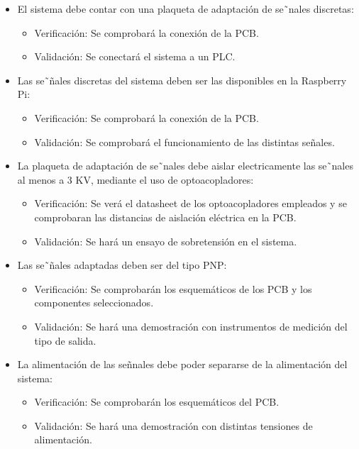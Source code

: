 \documentclass[
11pt, %
codirector, %
]{charter}
\begin{document}
\begin{itemize}
	\item \REQ El sistema debe contar con una plaqueta de adaptación de se˜nales discretas:
	\begin{itemize}
		\item Verificación: Se comprobará la conexión de la PCB.
		\item Validación: Se conectará el sistema a un PLC.
	\end{itemize}
	
	\item \REQ Las se˜ñales discretas del sistema deben ser las disponibles en la Raspberry Pi:
	\begin{itemize}
		\item Verificación: Se comprobará la conexión de la PCB.
		\item Validación: Se comprobará el funcionamiento de las distintas señales.
	\end{itemize}
	
	\item \REQ La plaqueta de adaptación de se˜nales debe aislar electricamente las se˜nales al menos a 3 KV, mediante el uso de optoacopladores:
	\begin{itemize}
		\item Verificación: Se verá el datasheet de los optoacopladores empleados y se comprobaran las distancias de aislación eléctrica en la PCB.
		\item Validación: Se hará un ensayo de sobretensión en el sistema.
	\end{itemize}
	
	\item \REQ Las se˜ñales adaptadas deben ser del tipo PNP:
	\begin{itemize}
		\item Verificación: Se comprobarán los esquemáticos de los PCB y los componentes seleccionados.
		\item Validación: Se hará una demostración con instrumentos de medición del tipo de salida.
	\end{itemize}	
	
	\item \REQ La alimentación de las señnales debe poder separarse de la alimentación del sistema:
	\begin{itemize}
		\item Verificación: Se comprobarán los esquemáticos del PCB.
		\item Validación: Se hará una demostración con distintas tensiones de alimentación.
	\end{itemize}
	

\end{itemize}
\end{document}
